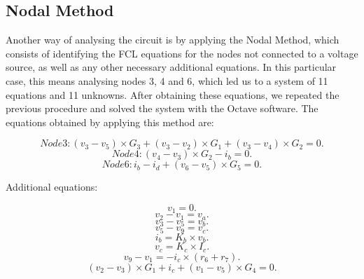\subsection{Nodal Method}

Another way of analysing the circuit is by applying the Nodal Method, which consists of identifying the FCL equations for the nodes not connected to a voltage source, as well as any other necessary additional equations. In this particular case, this means analysing nodes 3, 4 and 6, which led us to a system of 11 equations and 11 unknowns. After obtaining these equations, we repeated the previous procedure and solved the system with the Octave software. The equations obtained by applying this method are:


\begin{equation}
  Node 3 : (v_3 - v_5) \times G_3 + (v_3 - v_2) \times G_1 + (v_3 - v_4) \times G_2 = 0.
\end{equation}
\begin{equation}
  Node 4 : (v_4 - v_3) \times G_2 - i_b = 0.
\end{equation}
\begin{equation}
  Node 6 : i_b - i_d + (v_6 - v_5) \times G_5 = 0.
\end{equation}

Additional equations:

\begin{equation}
  v_1= 0.
\end{equation}
\begin{equation}
  v_2 - v_1 = v_a.
\end{equation}
\begin{equation}
  v_3 - v_5 = v_b.
\end{equation}
\begin{equation}
  v_5 - v_9 = v_c.
\end{equation}
\begin{equation}
  i_b = K_b \times v_b.
\end{equation}
\begin{equation}
  v_c = K_c \times I_c.
\end{equation}
\begin{equation}
  v_9 - v_1 = -i_c \times (r_6 + r_7).
\end{equation}
\begin{equation}
  (v_2 - v_3) \times G_1 + i_c +(v_1 - v_5) \times G_4 = 0.
\end{equation}

\pagebreak

